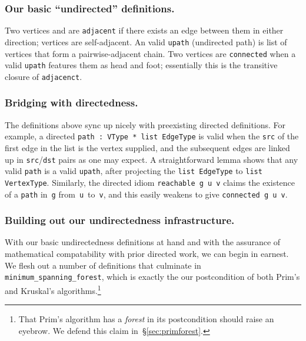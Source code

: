 

\subsubsection{Our basic ``undirected'' definitions.}
Two vertices  and  are \texttt{adjacent} if there exists
an edge between them in either direction; vertices are self-adjacent.
An valid \texttt{upath} (undirected path) is list of 
vertices that form a  
pairwise-adjacent chain. Two vertices are \texttt{connected} when a valid \texttt{upath}
features them as head and foot; essentially this is the transitive 
closure of \texttt{adjacenct}.

\subsubsection{Bridging with directedness.}
The definitions above sync up nicely with preexisting directed
definitions. 
For example, a directed \texttt{path~: VType~* list~EdgeType}
is valid when the \texttt{src} of the first edge in the list 
is the vertex supplied, and the subsequent edges are linked up 
in \texttt{src}/\texttt{dst} pairs
as one may expect. A straightforward lemma shows that 
any valid \texttt{path} is a valid \texttt{upath}, after projecting the
\texttt{list EdgeType} to \texttt{list VertexType}.
Similarly, the directed idiom \texttt{reachable~g~u~v} claims the 
existence of a \texttt{path} in~\texttt{g} from~\texttt{u}~to~\texttt{v}, 
and this easily weakens to give \texttt{connected~g~u~v}.

\subsubsection{Building out our undirectedness infrastructure.}
With our basic undirectedness definitions at hand and with the assurance
of mathematical compatability with prior directed work, we can begin in 
earnest. We flesh out a number of definitions that culminate in 
\texttt{minimum\_spanning\_forest}, which is exactly the our postcondition
of both Prim's and Kruskal's algorithms.\footnote{That Prim's algorithm has
a \emph{forest} in its postcondition should raise an eyebrow. We defend this claim
in~\S\ref{sec:primforest}.}

